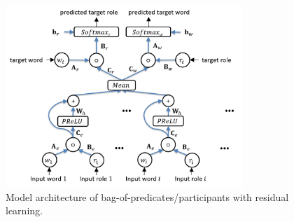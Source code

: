 \documentclass[a4paper]{article}
\begin{document}
\begin{figure}[t]
\centering
\includegraphics[width=0.8\textwidth]{BOPRes.png}
\caption{\label{fig:BOPRes} Model architecture of bag-of-predicates/participants with residual learning.}
\end{figure}

% 
% 
% 
% 
% 
%
\end{document}
